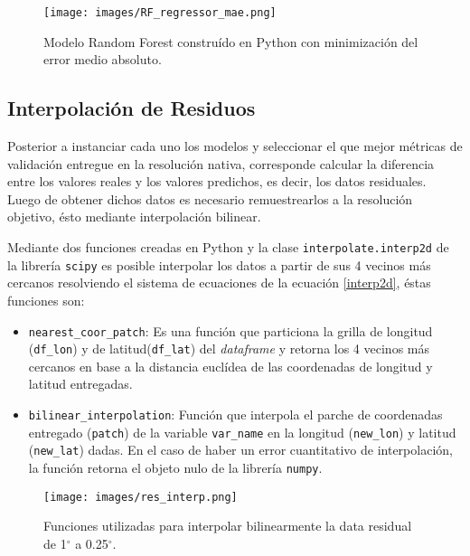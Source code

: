 \begin{figure}[H]
    \centering
          \texttt{[image: images/RF\_regressor\_mae.png]}
          \vskip -0.1in
    \caption[Construcción y entrenamiento del modelo Random Forest con criterio de \textit{mae}]{\footnotesize Modelo Random Forest construído en Python con minimización del error medio absoluto.}
    \label{logo3}
\end{figure}

    \subsection{Interpolación de Residuos}

    Posterior a instanciar cada uno los modelos y seleccionar el que mejor métricas de validación entregue en la resolución nativa, corresponde calcular la diferencia entre los valores reales y los valores predichos, es decir, los datos residuales.
    Luego de obtener dichos datos es necesario remuestrearlos a la resolución objetivo, ésto mediante interpolación bilinear.
 
    Mediante dos funciones creadas en Python y la clase \texttt{interpolate.interp2d} de la librería \texttt{scipy} es posible interpolar los datos a partir de sus 4 vecinos más cercanos resolviendo el sistema de ecuaciones
    de la ecuación \ref{interp2d}, éstas funciones son:
    \begin{itemize}
        \item {\texttt{nearest\_coor\_patch}: Es una función que particiona la grilla de longitud (\texttt{df\_lon}) y de latitud(\texttt{df\_lat}) del \textit{dataframe} y retorna los 4 vecinos más cercanos en base a la distancia euclídea
        de las coordenadas de longitud y latitud entregadas.}
        \item {\texttt{bilinear\_interpolation}: Función que interpola el parche de coordenadas entregado (\texttt{patch}) de la variable \texttt{var\_name} en la longitud (\texttt{new\_lon}) y latitud (\texttt{new\_lat}) dadas. En el caso de haber un error cuantitativo de interpolación,
         la función retorna el objeto nulo de la librería \texttt{numpy}.}
    \end{itemize}
    \begin{figure}[H]
        \centering
              \texttt{[image: images/res\_interp.png]}
              \vskip -0.1in
        \caption[Funciones utilizadas para la interpolación de residuos]{\footnotesize Funciones utilizadas para interpolar bilinearmente la data residual de 1$^{\circ}$ a 0.25$^{\circ}$.}
        \label{logo4}
    \end{figure}


